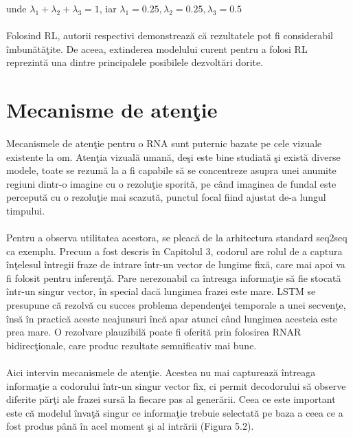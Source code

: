 unde \(\lambda_1 + \lambda_2 + \lambda_3 = 1\), iar \(\lambda_1 = 0.25, \lambda_2 = 0.25, \lambda_3 = 0.5\)

\paragraph{}
Folosind RL, autorii respectivi demonstreaz\u a c\u a rezultatele pot fi considerabil \^ imbun\u at\u a\c tite. De aceea, extinderea modelului curent pentru a folosi RL reprezint\u a una dintre principalele posibilele dezvolt\u ari dorite.

\section{Mecanisme de aten\c tie}

\paragraph{}
Mecanismele de aten\c tie \cite{DBLP:journals/corr/BahdanauCB14} pentru o RNA sunt puternic bazate pe cele vizuale existente la om. Aten\c tia vizual\u a uman\u a, de\c si este bine studiat\u a \c si exist\u a diverse modele, toate se rezum\u a la a fi capabile s\u a se concentreze asupra unei anumite regiuni dintr-o imagine cu o rezolu\c tie sporit\u a, pe c\^ and imaginea de fundal este perceput\u a cu o rezolu\c tie mai scazut\u a, punctul focal fiind ajustat de-a lungul timpului. 

\paragraph{}
Pentru a observa utilitatea acestora, se pleac\u a de la arhitectura standard seq2seq ca exemplu. Precum a fost descris \^ in Capitolul 3, codorul are rolul de a captura \^ in\c telesul \^ intregii fraze de intrare \^ intr-un vector de lungime fix\u a, care mai apoi va fi folosit pentru inferen\c t\u a. Pare nerezonabil ca \^ intreaga informa\c tie s\u a fie stocat\u a \^ intr-un singur vector, \^ in special dac\u a lungimea frazei este mare. LSTM se presupune c\u a rezolv\u a cu succes problema dependen\c tei temporale a unei secven\c te, \^ ins\u a \^ in practic\u a aceste neajunsuri \^ inc\u a apar atunci c\^ and lungimea acesteia este prea mare. O rezolvare plauzibil\u a poate fi oferit\u a prin folosirea RNAR bidirec\c tionale, care produc rezultate semnificativ mai bune. 

\paragraph{}
Aici intervin mecanismele de aten\c tie. Acestea nu mai captureaz\u a \^ intreaga informa\c tie a codorului \^ intr-un singur vector fix, ci permit decodorului s\u a observe diferite p\u ar\c ti ale frazei surs\u a la fiecare pas al gener\u arii. Ceea ce este important este c\u a modelul \^ inva\c t\u a singur ce informa\c tie trebuie selectat\u a pe baza a ceea ce a fost produs p\^ an\u a \^ in acel moment \c si al intr\u arii (Figura 5.2).

